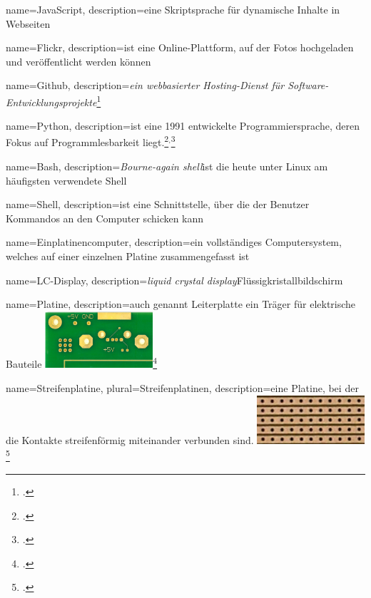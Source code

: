 
{
  name=JavaScript,
  description={eine Skriptsprache für dynamische Inhalte in Webseiten}
}

{
  name=Flickr,
  description={ist eine Online-Plattform, auf der Fotos hochgeladen und veröffentlicht werden können}
}

{
  name=Github,
  description={\emph{ein webbasierter Hosting-Dienst für Software-Entwicklungsprojekte}\footcite{wiki:github}}
}

{
  name=Python,
  description={ist eine 1991 entwickelte Programmiersprache, deren Fokus auf Programmlesbarkeit liegt.\footcite{python}$^,$\footcite{python_manual}{}}
}

{
  name=Bash,
  description={\textit{Bourne-again shell}\newline ist die heute unter Linux am häufigsten verwendete \gls{Shell}}
}

{
  name=Shell,
  description={ist eine Schnittstelle, über die der Benutzer Kommandos an den Computer schicken kann}
}

{
  name=Einplatinencomputer,
  description={ein vollständiges Computersystem, welches auf einer einzelnen \gls{Platine} zusammengefasst ist}
}

{
  name=LC-Display,
  description={\emph{liquid crystal display}\newline Flüssigkristallbildschirm}
}

{
  name=Platine,
  description={auch genannt Leiterplatte\newline
  ein Träger für elektrische Bauteile\newline
  \includegraphics[width=4cm]{figures/platine.png}\footcite{platine}
    	}
}

{
  name=Streifenplatine,
  plural=Streifenplatinen,
  description={eine \gls{Platine}, bei der die Kontakte streifenförmig miteinander verbunden sind.\newline
  \includegraphics[width=4cm]{figures/streifenplatine.png}\footcite{streifenplatine}
  	}
}

